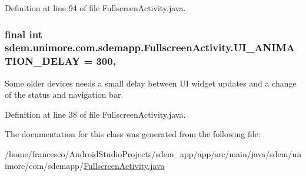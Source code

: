 Definition at line 94 of file Fullscreen\+Activity.\+java.

\hypertarget{classsdem_1_1unimore_1_1com_1_1sdemapp_1_1_fullscreen_activity_a9f1011912e7fd216a50482d516e03998}{
\subsubsection[{U\+I\+\_\+\+A\+N\+I\+M\+A\+T\+I\+O\+N\+\_\+\+D\+E\+L\+A\+Y}]{\setlength{\rightskip}{0pt plus 5cm}final int sdem.\+unimore.\+com.\+sdemapp.\+Fullscreen\+Activity.\+U\+I\+\_\+\+A\+N\+I\+M\+A\+T\+I\+O\+N\+\_\+\+D\+E\+L\+A\+Y = 300\hspace{0.3cm}{\ttfamily [static]}, {\ttfamily [private]}}}\label{classsdem_1_1unimore_1_1com_1_1sdemapp_1_1_fullscreen_activity_a9f1011912e7fd216a50482d516e03998}
Some older devices needs a small delay between U\+I widget updates and a change of the status and navigation bar. 

Definition at line 38 of file Fullscreen\+Activity.\+java.



The documentation for this class was generated from the following file\+:\begin{DoxyCompactItemize}
\item 
/home/francesco/\+Android\+Studio\+Projects/sdem\+\_\+app/app/src/main/java/sdem/unimore/com/sdemapp/\hyperlink{_fullscreen_activity_8java}{Fullscreen\+Activity.\+java}\end{DoxyCompactItemize}
